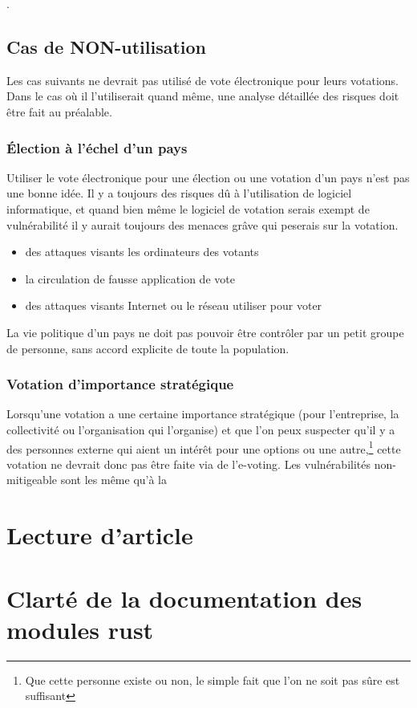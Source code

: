 \documentclass[../report]{subfiles}
\begin{document}
%

.

\section{Cas de NON-utilisation}

Les cas suivants ne devrait pas utilisé de vote électronique pour leurs votations. 
Dans le cas où il l'utiliserait quand même, une analyse détaillée des risques doit être fait au préalable.

\subsection{Élection à l'échel d'un pays}\label{sec:impl:non-use:pays}
Utiliser le vote électronique pour une élection ou une votation d'un pays n'est pas une bonne idée.
Il y a toujours des risques dû à l'utilisation de logiciel informatique, et quand bien même le logiciel de 
votation serais exempt de vulnérabilité il y aurait toujours des menaces grâve qui peserais sur la votation.
\begin{itemize}
  \item des attaques visants les ordinateurs des votants
  \item la circulation de fausse application de vote
  \item des attaques visants Internet ou le réseau utiliser pour voter
\end{itemize}

La vie politique d'un pays ne doit pas pouvoir être contrôler par un petit groupe de personne, sans accord 
explicite de toute la population.

\subsection{Votation d'importance stratégique}
Lorsqu'une votation a une certaine importance stratégique (pour l'entreprise, la collectivité ou l'organisation qui l'organise)
et que l'on peux suspecter qu'il y a des personnes externe qui aient un intérêt pour une options ou une 
autre,\footnote{Que cette personne existe ou non, le simple fait que l'on ne soit pas sûre est suffisant}
cette votation ne devrait donc pas être faite via de l'e-voting. 
Les vulnérabilités non-mitigeable sont les même qu'à la 


\chapter{Lecture d'article}
\chapter{Clarté de la documentation des modules rust}
\end{document}
